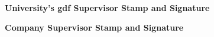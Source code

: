 \documentclass[12pt,oneside, a4paper]{report}
\def\defaultFont{ptm}
\renewcommand*{\familydefault}{\defaultFont}
\begin{document}
  \dominitoc
    
    \singlespacing{}%
    
    \noindent
    \begin{center}
        {\LARGE \textbf{University’s gdf Supervisor Stamp and Signature}}
    \end{center}
    \vspace{0.5cm}
    \begin{center}
    
        
    \end{center}
    \vspace{1cm}
    \noindent
    \begin{center}
        {\LARGE \textbf{Company Supervisor Stamp and Signature}}
    \end{center}
    \vspace{0.5cm}
    \begin{center}
        
    \end{center}
        \mbox{}
        \clearpage %
    
    

    

     
    \renewcommand*\contentsname{Table de matières}
    \begin{spacing}{1}
    \tableofcontents
    \end{spacing}

    
\end{document}
